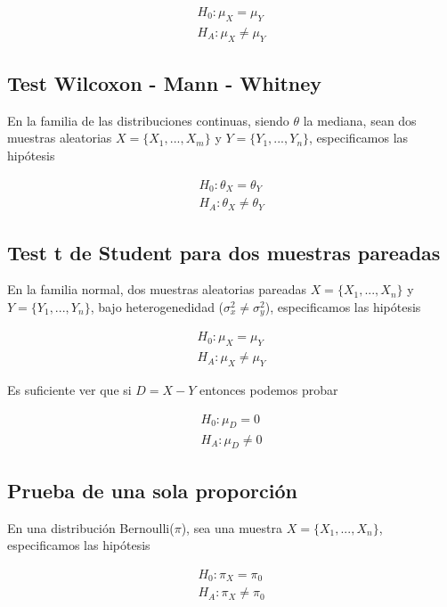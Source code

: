 \documentclass[
  letterpaper,
  DIV=11,
  numbers=noendperiod]{scrreprt}
\begin{document}
\[
\begin{align*}
  H_0: \mu_X = \mu_Y\\
  H_A: \mu_X \neq \mu_Y
\end{align*}
\]

\subsection{Test Wilcoxon - Mann -
Whitney}\label{test-wilcoxon---mann---whitney}

En la familia de las distribuciones continuas, siendo \(\theta\) la
mediana, sean dos muestras aleatorias \(X = \{X_1, ... , X_m\}\) y
\(Y = \{Y_1, ... , Y_n\}\), especificamos las hipótesis

\[
\begin{align*}
  H_0: \theta_X = \theta_Y\\
  H_A: \theta_X \neq \theta_Y
\end{align*}
\]

\subsection{Test t de Student para dos muestras
pareadas}\label{test-t-de-student-para-dos-muestras-pareadas}

En la familia normal, dos muestras aleatorias pareadas
\(X = \{X_1, ... , X_n\}\) y \(Y = \{Y_1, ... , Y_n\}\), bajo
heterogenedidad (\(\sigma^2_x \neq \sigma^2_y\)), especificamos las
hipótesis

\[
\begin{align*}
  H_0: \mu_X = \mu_Y\\
  H_A: \mu_X \neq \mu_Y
\end{align*}
\]

Es suficiente ver que si \(D = X - Y\) entonces podemos probar

\[
\begin{align*}
  H_0: \mu_D = 0\\
  H_A: \mu_D \neq 0
\end{align*}
\]

\subsection{Prueba de una sola
proporción}\label{prueba-de-una-sola-proporciuxf3n}

En una distribución Bernoulli(\(\pi\)), sea una muestra
\(X = \{X_1, ... , X_n\}\), especificamos las hipótesis

\[
\begin{align*}
  H_0: \pi_X = \pi_0\\
  H_A: \pi_X \neq \pi_0
\end{align*}
\]
\end{document}
